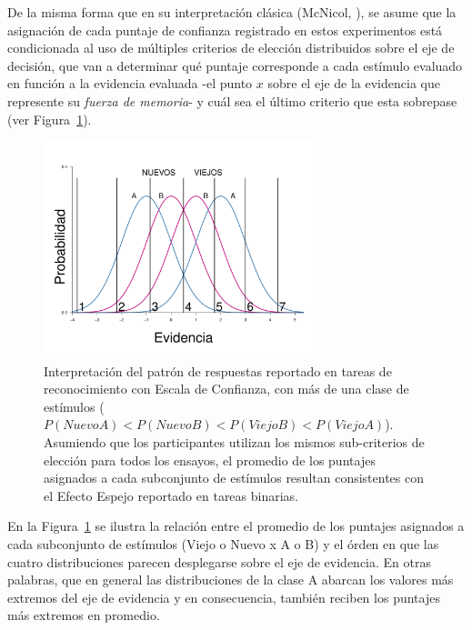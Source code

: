 \begin{itemize}
De la misma forma que en su interpretación clásica (McNicol, \citeyear{McNicol2, McNicol5}), se asume que la asignación de cada puntaje de confianza registrado en estos experimentos está condicionada al uso de múltiples criterios de elección distribuidos sobre el eje de decisión, que van a determinar qué puntaje corresponde a cada estímulo evaluado en función a la evidencia evaluada -el punto $x$ sobre el eje de la evidencia que represente su \textit{fuerza de memoria}- y cuál sea el último criterio que esta sobrepase (ver Figura~\ref{fig:Ejem_Efecto_Punt}).\\

\begin{figure}[th]
\centering
\includegraphics[width=0.7\textwidth]{Figures/EfectoEspejo_Puntajes}
\caption[Efecto Espejo en tareas de detección con Escala de Confianza]{Interpretación del patrón de respuestas reportado en tareas de reconocimiento con Escala de Confianza, con más de una clase de estímulos ($P(NuevoA) < P(NuevoB) < P(ViejoB) < P(ViejoA)$). Asumiendo que los participantes utilizan los mismos sub-criterios de elección para todos los ensayos, el promedio de los puntajes asignados a cada subconjunto de estímulos resultan consistentes con el Efecto Espejo reportado en tareas binarias.}
\label{fig:Ejem_Efecto_Punt}
\end{figure}

En la Figura~\ref{fig:Ejem_Efecto_Punt} se ilustra la relación entre el promedio de los puntajes asignados a cada subconjunto de estímulos (Viejo o Nuevo x A o B) y el órden en que las cuatro distribuciones parecen desplegarse sobre el eje de evidencia. En otras palabras, que en general las distribuciones de la clase A abarcan los valores más extremos del eje de evidencia y en consecuencia, también reciben los puntajes más extremos en promedio.\\


\end{itemize}
